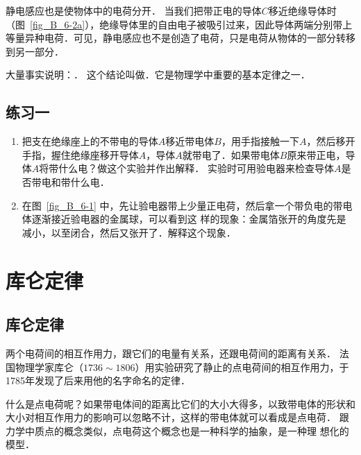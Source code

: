 静电感应也是使物体中的电荷分开．
当我们把带正电的导体$C$移近绝缘导体时（图~\ref{fig_B_6-2a}），绝缘导体里的自由电子被吸引过来，因此导体两端分别带上等量异种电荷．可见，静电感应也不是创造了电荷，只是电荷从物体的一部分转移到另一部分．


大量事实说明：．
这个结论叫做．它是物理学中重要的基本定律之一．

\subsection*{练习一}
\begin{enumerate}
\item 把支在绝缘座上的不带电的导体$A$移近带电体$B$，用手指接触一下$A$，然后移开手指，握住绝缘座移开导体$A$，导体$A$就带电了．如果带电体$B$原来带正电，导体$A$将带什么电？做这个实验并作出解释．
实验时可用验电器来检查导体$A$是否带电和带什么电．
\item 在图~\ref{fig_B_6-1} 中，先让验电器带上少量正电荷，然后拿一个带负电的带电体逐渐接近验电器的金属球，可以看到这
样的现象：金属箔张开的角度先是减小，以至闭合，然后又张开了．解释这个现象．
\end{enumerate}


\section{库仑定律}
\subsection{库仑定律} 

两个电荷间的相互作用力，跟它们的电量有关系，还跟电荷间的距离有关系．
法国物理学家库仑（$1736 \sim 1806$）用实验研究了静止的点电荷间的相互作用力，于1785年发现了后来用他的名字命名的定律．

什么是点电荷呢？如果带电体间的距离比它们的大小大得多，以致带电体的形状和大小对相互作用力的影响可以忽略不计，这样的带电体就可以看成是点电荷．
跟力学中质点的概念类似，点电荷这个概念也是一种科学的抽象，是一种理
想化的模型．

